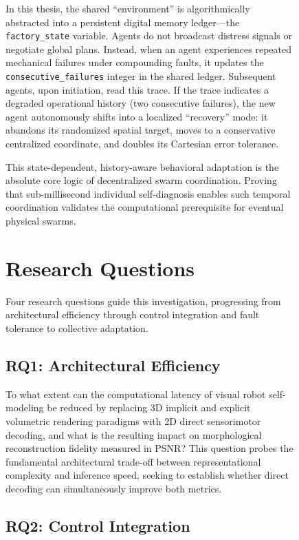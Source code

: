 \documentclass[12pt,a4paper,oneside]{report}
\begin{document}
\begin{figure}[H]
In this thesis, the shared ``environment'' is algorithmically abstracted into a persistent digital memory ledger---the \texttt{factory\_state} variable. Agents do not broadcast distress signals or negotiate global plans. Instead, when an agent experiences repeated mechanical failures under compounding faults, it updates the \texttt{consecutive\_failures} integer in the shared ledger. Subsequent agents, upon initiation, read this trace. If the trace indicates a degraded operational history (two consecutive failures), the new agent autonomously shifts into a localized ``recovery'' mode: it abandons its randomized spatial target, moves to a conservative centralized coordinate, and doubles its Cartesian error tolerance.

This state-dependent, history-aware behavioral adaptation is the absolute core logic of decentralized swarm coordination. Proving that sub-millisecond individual self-diagnosis enables such temporal coordination validates the computational prerequisite for eventual physical swarms.

\section{Research Questions}
\label{sec:research_questions_intro}

Four research questions guide this investigation, progressing from architectural efficiency through control integration and fault tolerance to collective adaptation.

\subsection{RQ1: Architectural Efficiency}
\label{subsec:RQ1_intro}

To what extent can the computational latency of visual robot self-modeling be reduced by replacing 3D implicit and explicit volumetric rendering paradigms with 2D direct sensorimotor decoding, and what is the resulting impact on morphological reconstruction fidelity measured in PSNR? This question probes the fundamental architectural trade-off between representational complexity and inference speed, seeking to establish whether direct decoding can simultaneously improve both metrics.

\subsection{RQ2: Control Integration}
\label{subsec:RQ2_intro}


\end{figure}
\end{document}
